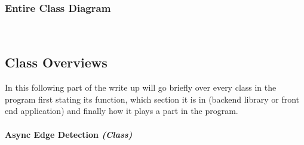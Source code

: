 \begin{FlushLeft}
    \begin{figure}[H]
        \centering
    \end{figure}\\

    \\ \BK

    \subsubsection{Entire Class Diagram}
    
        
    \\ \bk

    \subsection{Class Overviews}

    In this following part of the write up will go briefly over every class in the program first stating its function, which section it is in (backend library or front end application) and finally how it plays a part in the program.

    \paragraph{Async Edge Detection \textit{(Class)}} \mbox{} \\

    \begin{figure}[H]
        \centering
    \end{figure}\\


\end{FlushLeft}
